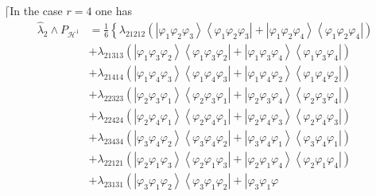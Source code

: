 \documentclass[12pt]{article}
\begin{document}
$\lceil $In the case $r=4$ one has 
\begin{align*}
\hat{\lambda}_{2}\wedge P_{\mathcal{H}^{1}}& =\frac{1}{6}\left\{ \lambda
_{21212}\left( \left\vert \varphi _{1}\varphi _{2}\varphi _{3}\right\rangle
\left\langle \varphi _{1}\varphi _{2}\varphi _{3}\right\vert +\left\vert
\varphi _{1}\varphi _{2}\varphi _{4}\right\rangle \left\langle \varphi
_{1}\varphi _{2}\varphi _{4}\right\vert \right) \right. \\
& +\lambda _{21313}\left( \left\vert \varphi _{1}\varphi _{3}\varphi
_{2}\right\rangle \left\langle \varphi _{1}\varphi _{3}\varphi
_{2}\right\vert +\left\vert \varphi _{1}\varphi _{3}\varphi
_{4}\right\rangle \left\langle \varphi _{1}\varphi _{3}\varphi
_{4}\right\vert \right) \\
& +\lambda _{21414}\left( \left\vert \varphi _{1}\varphi _{4}\varphi
_{3}\right\rangle \left\langle \varphi _{1}\varphi _{4}\varphi
_{3}\right\vert +\left\vert \varphi _{1}\varphi _{4}\varphi
_{2}\right\rangle \left\langle \varphi _{1}\varphi _{4}\varphi
_{2}\right\vert \right) \\
& +\lambda _{22323}\left( \left\vert \varphi _{2}\varphi _{3}\varphi
_{1}\right\rangle \left\langle \varphi _{2}\varphi _{3}\varphi
_{1}\right\vert +\left\vert \varphi _{2}\varphi _{3}\varphi
_{4}\right\rangle \left\langle \varphi _{2}\varphi _{3}\varphi
_{4}\right\vert \right) \\
& +\lambda _{22424}\left( \left\vert \varphi _{2}\varphi _{4}\varphi
_{1}\right\rangle \left\langle \varphi _{2}\varphi _{4}\varphi
_{1}\right\vert +\left\vert \varphi _{2}\varphi _{4}\varphi
_{3}\right\rangle \left\langle \varphi _{2}\varphi _{4}\varphi
_{3}\right\vert \right) \\
& +\lambda _{23434}\left( \left\vert \varphi _{3}\varphi _{4}\varphi
_{2}\right\rangle \left\langle \varphi _{3}\varphi _{4}\varphi
_{2}\right\vert +\left\vert \varphi _{3}\varphi _{4}\varphi
_{1}\right\rangle \left\langle \varphi _{3}\varphi _{4}\varphi
_{1}\right\vert \right) \\
& +\lambda _{22121}\left( \left\vert \varphi _{2}\varphi _{1}\varphi
_{3}\right\rangle \left\langle \varphi _{2}\varphi _{1}\varphi
_{3}\right\vert +\left\vert \varphi _{2}\varphi _{1}\varphi
_{4}\right\rangle \left\langle \varphi _{2}\varphi _{1}\varphi
_{4}\right\vert \right) \\
& +\lambda _{23131}\left( \left\vert \varphi _{3}\varphi _{1}\varphi
_{2}\right\rangle \left\langle \varphi _{3}\varphi _{1}\varphi
_{2}\right\vert +\left\vert \varphi _{3}\varphi _{1}\varphi

\end{align*}
\end{document}
